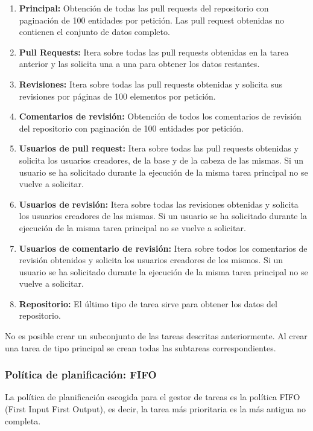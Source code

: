 \begin{enumerate}
\tightlist
	\item \textbf{Principal:} Obtención de todas las pull requests del repositorio con paginación de 100 entidades por petición. Las pull request obtenidas no contienen el conjunto de datos completo.
	\item \textbf{Pull Requests:} Itera sobre todas las pull requests obtenidas en la tarea anterior y las solicita una a una para obtener los datos restantes.
	\item \textbf{Revisiones:} Itera sobre todas las pull requests obtenidas y solicita sus revisiones por páginas de 100 elementos por petición.
	\item \textbf{Comentarios de revisión:} Obtención de todos los comentarios de revisión del repositorio con paginación de 100 entidades por petición.
	\item \textbf{Usuarios de pull request:} Itera sobre todas las pull requests obtenidas y solicita los usuarios creadores, de la base y de la cabeza de las mismas. Si un usuario se ha solicitado durante la ejecución de la misma tarea principal no se vuelve a solicitar.
	\item \textbf{Usuarios de revisión:} Itera sobre todas las revisiones obtenidas y solicita los usuarios creadores de las mismas. Si un usuario se ha solicitado durante la ejecución de la misma tarea principal no se vuelve a solicitar.
	\item \textbf{Usuarios de comentario de revisión:} Itera sobre todos los comentarios de revisión obtenidos y solicita los usuarios creadores de los mismos. Si un usuario se ha solicitado durante la ejecución de la misma tarea principal no se vuelve a solicitar.
	\item \textbf{Repositorio:} El último tipo de tarea sirve para obtener los datos del repositorio.
\end{enumerate}

No es posible crear un subconjunto de las tareas descritas anteriormente. Al crear una tarea de tipo principal se crean todas las subtareas correspondientes.

\subsubsection{Política de planificación: FIFO}

La política de planificación escogida para el gestor de tareas es la política FIFO (First Input First Output), es decir, la tarea más prioritaria es la más antigua no completa.

